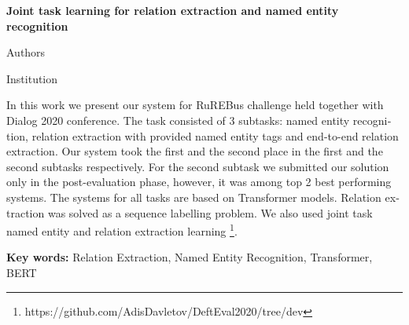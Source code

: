 \documentclass{dialogue}
\begin{document}
	
	\begin{otherlanguage}{english}
		\begin{center}
			{\Large\bfseries{Joint task learning for relation extraction and named entity recognition}}
			
			\medskip
			
			Authors
			
			\medskip
			
			Institution
		\end{center}
		
		In this work we present our system for RuREBus challenge held together with Dialog 2020 conference. The task consisted of 3 subtasks: named entity recognition, relation extraction with provided named entity tags and end-to-end relation extraction. Our system took the first and the second place in the first and the second subtasks respectively. For the second subtask we submitted our solution only in the post-evaluation phase, however, it was among top 2 best performing systems. The systems for all tasks are based on Transformer models. Relation extraction was solved as a sequence labelling problem. We also used joint task named entity and relation extraction learning \footnote{https://github.com/AdisDavletov/DeftEval2020/tree/dev}.
		
		\textbf{Key words:} Relation Extraction, Named Entity Recognition, Transformer, BERT
	\end{otherlanguage}
	
	\bigskip
	
\end{document}
